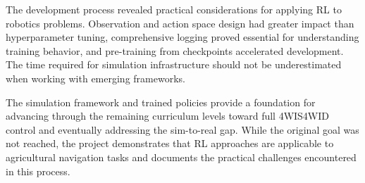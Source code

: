 \documentclass[11pt,a4paper,twocolumn]{article}
\begin{document}
The development process revealed practical considerations for applying RL to robotics problems. Observation and action space design had greater impact than hyperparameter tuning, comprehensive logging proved essential for understanding training behavior, and pre-training from checkpoints accelerated development. The time required for simulation infrastructure should not be underestimated when working with emerging frameworks.

The simulation framework and trained policies provide a foundation for advancing through the remaining curriculum levels toward full 4WIS4WID control and eventually addressing the sim-to-real gap. While the original goal was not reached, the project demonstrates that RL approaches are applicable to agricultural navigation tasks and documents the practical challenges encountered in this process.


\end{document}
